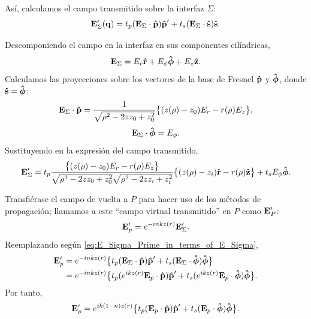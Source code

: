 Así, calculamos el campo transmitido sobre la interfaz $\Sigma$:
\begin{equation}
    \vb{E}'_{\Sigma}(\vb{q})
    =
    t_p (\vb{E}_{\Sigma} \cdot \bm{\hat{\mathbf{p}}}) \bm{\hat{\mathbf{p}}}'
    +
    t_s (\vb{E}_{\Sigma} \cdot \bm{\hat{\mathbf{s}}}) \bm{\hat{\mathbf{s}}}.
\label{eq:E_Sigma_Prime_in_terms_of_E_Sigma}
\end{equation}

Descomponiendo el campo en la interfaz en sus componentes cilíndricas,
\begin{equation}
    \vb{E}_{\Sigma}
    =
    E_r \bm{\hat{\mathbf{r}}}
    +
    E_{\phi} \bm{\hat{\mathbf{\phi}}}
    +
    E_z \bm{\hat{\mathbf{z}}}.
\end{equation}
Calculamos las proyecciones sobre los vectores de la base de Fresnel $\bm{\hat{\mathbf{p}}}$ y $\bm{\hat{\mathbf{\phi}}}$, donde $\bm{\hat{\mathbf{s}}}=\bm{\hat{\mathbf{\phi}}}$:
\begin{equation}
    \vb{E}_{\Sigma} \cdot \bm{\hat{\mathbf{p}}}
    =
    \frac{1}{\sqrt{\rho^2 - 2zz_0 + z_0^2}}
    \big\{
    (z(\rho) - z_0) E_r
    -
    r(\rho) E_z
    \big\},
\end{equation}
\begin{equation}
    \vb{E}_{\Sigma} \cdot \bm{\hat{\mathbf{\phi}}}
    =
    E_{\phi}.
\end{equation}
Sustituyendo en la expresión del campo transmitido,
\begin{equation}
    \vb{E}'_{\Sigma}
    =
    t_p
    \frac{
    \big\{ (z(\rho) - z_0) E_r - r(\rho) E_z \big\}
    }
    {
    \sqrt{\rho^2 - 2zz_0 + z_0^2}
    \sqrt{\rho^2 - 2zz_i + z_i^2}
    }
    \big\{
    (z(\rho) - z_i) \bm{\hat{\mathbf{r}}}
    -
    r(\rho) \bm{\hat{\mathbf{z}}}
    \big\}
    +
    t_s E_{\phi} \bm{\hat{\mathbf{\phi}}}.
\end{equation}

Transfiérase el campo de vuelta a $P$ para hacer uso de los métodos de propagación; llamamos a este ``campo virtual transmitido'' en $P$ como $\vb{E}_P'$:
\begin{equation}
    \vb{E}_p'
    =
    e^{-inkz(r)} \vb{E}_{\Sigma}'.
\end{equation}
Reemplazando según \eqref{eq:E_Sigma_Prime_in_terms_of_E_Sigma},
\begin{align}
    \vb{E}_p'
    &=
    e^{-inkz(r)}
    \big\{
    t_p (\vb{E}_{\Sigma} \cdot \bm{\hat{\mathbf{p}}}) \bm{\hat{\mathbf{p}}}'
    +
    t_s (\vb{E}_{\Sigma} \cdot \bm{\hat{\mathbf{\phi}}}) \bm{\hat{\mathbf{\phi}}}
    \big\}
    \nonumber
    \\
    &=
    e^{-inkz(r)}
    \big\{
    t_p (e^{ikz(r)} \vb{E}_p \cdot \bm{\hat{\mathbf{p}}}) \bm{\hat{\mathbf{p}}}'
    +
    t_s (e^{ikz(r)} \vb{E}_p \cdot \bm{\hat{\mathbf{\phi}}}) \bm{\hat{\mathbf{\phi}}}
    \big\}.
\end{align}
Por tanto,
\begin{equation}
    \vb{E}_p'
    =
    e^{ik(1-n)z(r)}
    \big\{
    t_p (\vb{E}_p \cdot \bm{\hat{\mathbf{p}}}) \bm{\hat{\mathbf{p}}}'
    +
    t_s (\vb{E}_p \cdot \bm{\hat{\mathbf{\phi}}}) \bm{\hat{\mathbf{\phi}}}
    \big\}.
\end{equation}

